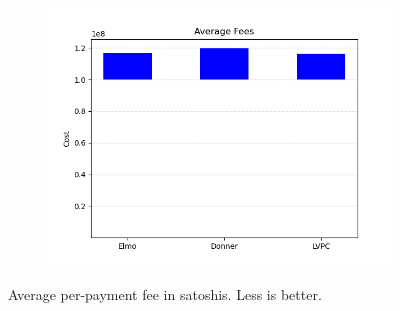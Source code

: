\begin{figure}
\begin{subfigure}{.3293\textwidth}
  \includegraphics[width=\textwidth]{../simulation/Fees_uniform.png}
  \end{subfigure}
  \caption{Average per-payment fee in satoshis. Less is better.}
  \end{figure}
